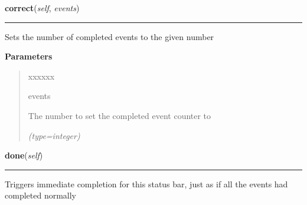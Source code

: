 \hspace{.8\funcindent}\begin{boxedminipage}{\funcwidth}

    \raggedright \textbf{correct}(\textit{self}, \textit{events})

    \vspace{-1.5ex}

    \rule{\textwidth}{0.5\fboxrule}
\setlength{\parskip}{2ex}
    Sets the number of completed events to the given number

\setlength{\parskip}{1ex}
      \textbf{Parameters}
      \vspace{-1ex}

      \begin{quote}
        \begin{Ventry}{xxxxxx}

          \item[events]

          The number to set the completed event counter to

            {\it (type=integer)}

        \end{Ventry}

      \end{quote}

    \end{boxedminipage}

    \label{morpher:misc:status_reporter:StatusReporter:done}

    \vspace{0.5ex}

\hspace{.8\funcindent}\begin{boxedminipage}{\funcwidth}

    \raggedright \textbf{done}(\textit{self})

    \vspace{-1.5ex}

    \rule{\textwidth}{0.5\fboxrule}
\setlength{\parskip}{2ex}
    Triggers immediate completion for this status bar, just as if all the 
    events had completed normally

\setlength{\parskip}{1ex}
    \end{boxedminipage}

